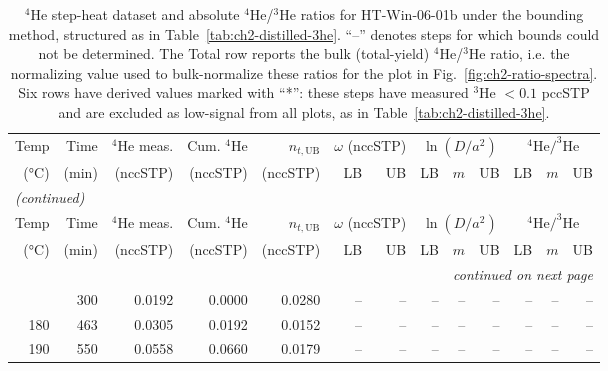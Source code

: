 {\let\scriptsize\normalsize
\begin{landscape}
\setlength{\tabcolsep}{5pt}
\begin{longtable}{r r r r r r r r r r r r r}
\caption{$^4$He step-heat dataset and absolute $^4$He/$^3$He ratios for HT-Win-06-01b under the bounding method, structured as in Table~\ref{tab:ch2-distilled-3he}. ``--'' denotes steps for which bounds could not be determined. The Total row reports the bulk (total-yield) $^4$He/$^3$He ratio, i.e. the normalizing value used to bulk-normalize these ratios for the plot in Fig.~\ref{fig:ch2-ratio-spectra}. Six rows have derived values marked with ``*'': these steps have measured $^3$He $<0.1$ pccSTP and are excluded as low-signal from all plots, as in Table~\ref{tab:ch2-distilled-3he}.}\label{tab:ch2-distilled-4he}\\
\toprule
Temp & Time & $^4$He meas. & Cum. $^4$He & $n_{t,\mathrm{UB}}$ & \multicolumn{2}{c}{$\omega$ (nccSTP)} & \multicolumn{3}{c}{$\ln(D/a^2)$} & \multicolumn{3}{c}{$^4\mathrm{He}/^3\mathrm{He}$} \\
\cmidrule(lr){6-7}\cmidrule(lr){8-10}\cmidrule(lr){11-13}
(°C) & (min) & (nccSTP) & (nccSTP) & (nccSTP) & LB & UB & LB & $m$ & UB & LB & $m$ & UB \\
\midrule
\endfirsthead
\multicolumn{13}{l}{\textit{(continued)}} \\
\toprule
Temp & Time & $^4$He meas. & Cum. $^4$He & $n_{t,\mathrm{UB}}$ & \multicolumn{2}{c}{$\omega$ (nccSTP)} & \multicolumn{3}{c}{$\ln(D/a^2)$} & \multicolumn{3}{c}{$^4\mathrm{He}/^3\mathrm{He}$} \\
\cmidrule(lr){6-7}\cmidrule(lr){8-10}\cmidrule(lr){11-13}
(°C) & (min) & (nccSTP) & (nccSTP) & (nccSTP) & LB & UB & LB & $m$ & UB & LB & $m$ & UB \\
\midrule
\endhead
\midrule
\multicolumn{13}{r}{\textit{continued on next page}} \\
\endfoot
\bottomrule
\endlastfoot
170 & 300 & 0.0192 & 0.0000 & 0.0280 & -- & -- & -- & -- & -- & -- & -- & -- \\
180 & 463 & 0.0305 & 0.0192 & 0.0152 & -- & -- & -- & -- & -- & -- & -- & -- \\
190 & 550 & 0.0558 & 0.0660 & 0.0179 & -- & -- & -- & -- & -- & -- & -- & -- \\

\end{longtable}
\end{landscape}}
